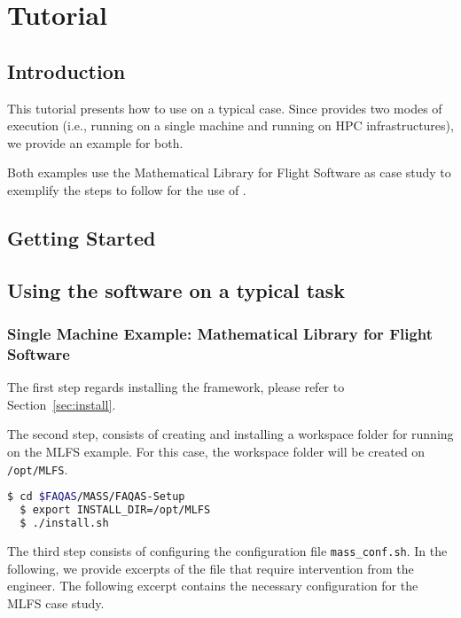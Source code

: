 
\chapter{Tutorial}

\section{Introduction}

This tutorial presents how to use \MASS on a typical case. Since \MASS provides two modes of execution (i.e., running \MASS on a single machine and running \MASS on HPC infrastructures), we provide an example for both.

Both examples use the Mathematical Library for Flight Software as case study to exemplify the steps to follow for the use of \FAQAS.

\section{Getting Started}


\section{Using the software on a typical task}

\subsection{Single Machine Example: Mathematical Library for Flight Software}

The first step regards installing the \MASS framework, please refer to Section~\ref{sec:install}.

The second step, consists of creating and installing a workspace folder for running \MASS on the MLFS example. For this case, the workspace folder will be created on \texttt{/opt/MLFS}.

\begin{lstlisting}[language=bash]
  $ cd $FAQAS/MASS/FAQAS-Setup
  $ export INSTALL_DIR=/opt/MLFS
  $ ./install.sh
\end{lstlisting}

The third step consists of configuring the \MASS configuration file \texttt{mass\_conf.sh}. In the following, we provide excerpts of the file that require intervention from the engineer. The following excerpt contains the necessary configuration for the MLFS case study.

